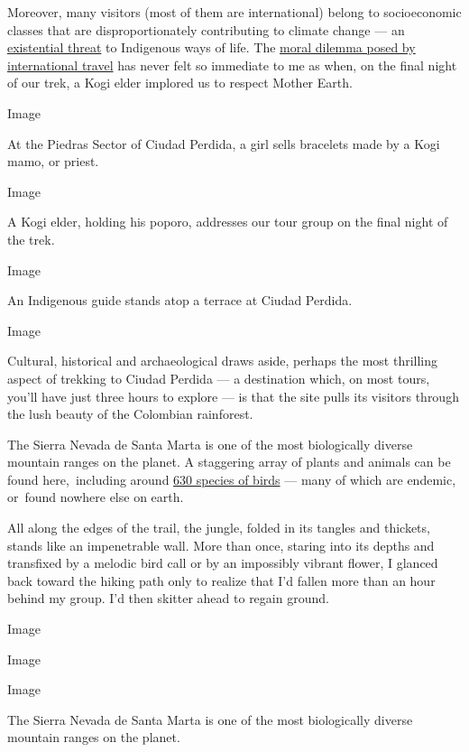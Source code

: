 Moreover, many visitors (most of them are international) belong to
socioeconomic classes that are disproportionately contributing to
climate change --- an
\href{https://www.nationalgeographic.com/history/2019/11/indigenous-protectors-sacred-peaks-secret-until-now/}{existential
threat} to Indigenous ways of life. The
\href{https://www.nytimes.com/2019/06/03/travel/traveling-climate-change.html}{moral
dilemma posed by international travel} has never felt so immediate to me
as when, on the final night of our trek, a Kogi elder implored us to
respect Mother Earth.

Image

At the Piedras Sector of Ciudad Perdida, a girl sells bracelets made by
a Kogi mamo, or priest.

Image

A Kogi elder, holding his poporo, addresses our tour group on the final
night of the trek.

Image

An Indigenous guide stands atop a terrace at Ciudad Perdida.

Image

Cultural, historical and archaeological draws aside, perhaps the most
thrilling aspect of trekking to Ciudad Perdida --- a destination which,
on most tours, you'll have just three hours to explore --- is that the
site pulls its visitors through the lush beauty of the Colombian
rainforest.

The Sierra Nevada de Santa Marta is one of the most biologically diverse
mountain ranges on the planet. A staggering array of plants and animals
can be found here,~including around
\href{https://www.npr.org/sections/parallels/2016/04/27/475716092/as-colombia-grows-safer-tourists-especially-bird-lovers-flock-back}{630
species of birds} --- many of which are endemic, or~found nowhere else
on earth.

All along the edges of the trail, the jungle, folded in its tangles and
thickets, stands like an impenetrable wall. More than once, staring into
its depths and transfixed by a melodic bird call or by an impossibly
vibrant flower, I glanced back toward the hiking path only to realize
that I'd fallen more than an hour behind my group. I'd then skitter
ahead to regain ground.

Image

Image

Image

The Sierra Nevada de Santa Marta is one of the most biologically diverse
mountain ranges on the planet.

